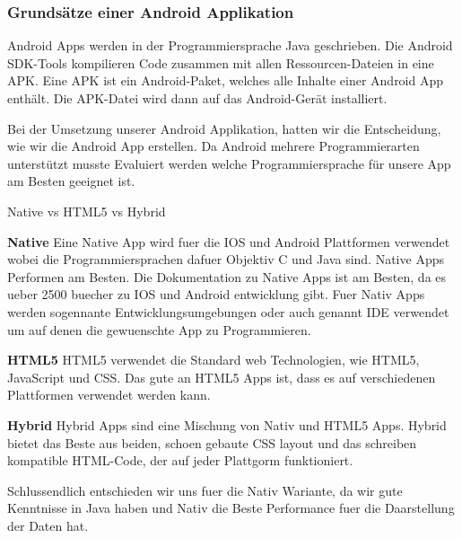 \subsubsection{Grundsätze einer Android Applikation}
\label{subsec:aapp-fundam}

Android Apps werden in der Programmiersprache Java geschrieben.
Die Android SDK-Tools kompilieren Code zusammen mit allen Ressourcen-Dateien in eine APK.
Eine APK ist ein Android-Paket, welches alle Inhalte einer Android App enthält. 
Die APK-Datei wird dann auf das Android-Gerät installiert. 
\newline

Bei der Umsetzung unserer Android Applikation, hatten wir die Entscheidung, wie wir die Android App erstellen. 
Da Android mehrere Programmierarten unterstützt musste Evaluiert werden welche Programmiersprache für unsere App am Besten geeignet ist. \newline

{\Large Native vs HTML5 vs Hybrid}\newline

\textbf{Native} 
\newline
Eine Native App wird fuer die IOS und Android Plattformen verwendet wobei die Programmiersprachen dafuer Objektiv C und Java sind.
Native Apps Performen am Besten.
Die Dokumentation zu Native Apps ist am Besten, da es ueber 2500 buecher zu IOS und Android entwicklung gibt.
Fuer Nativ Apps werden sogennante Entwicklungsumgebungen oder auch genannt IDE verwendet um auf denen die gewuenschte App zu Programmieren. 

\newline
\textbf{HTML5} 
\newline
HTML5 verwendet die Standard web Technologien, wie HTML5, JavaScript und CSS. Das gute an HTML5 Apps ist, dass es auf verschiedenen Plattformen verwendet werden kann. 
\newline

\textbf{Hybrid} 
\newline
Hybrid Apps sind eine Mischung von Nativ und HTML5 Apps. Hybrid bietet das Beste aus beiden, schoen gebaute CSS layout und das schreiben kompatible HTML-Code, der auf jeder Plattgorm funktioniert. 

\newline
\newline

Schlussendlich entschieden wir uns fuer die Nativ Wariante, da wir gute Kenntnisse in Java haben und Nativ die Beste Performance fuer die Daarstellung der Daten hat.


\cite{FAIF.CH2-android-dev.NativeWeborHybrid}
\clearpage %